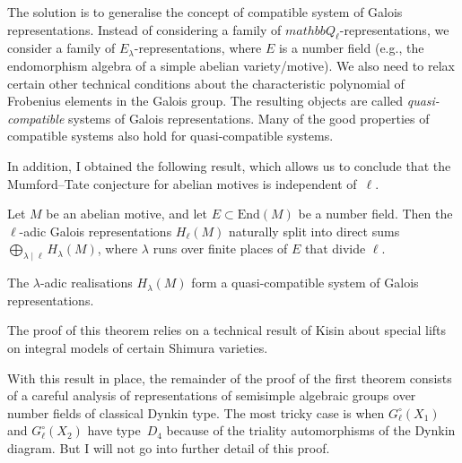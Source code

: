 The solution is to generalise the concept of compatible system of Galois representations.
Instead of considering a family of $mathbb Q_\ell$-representations,
we consider a family of $E_\lambda$-representations, where $E$ is a number field
(e.g., the endomorphism algebra of a simple abelian variety/motive).
We also need to relax certain other technical conditions
about the characteristic polynomial of Frobenius elements in the Galois group.
The resulting objects are called \emph{quasi-compatible} systems of Galois representations.
Many of the good properties of compatible systems also hold for quasi-compatible systems.

In addition, I obtained the following result,
which allows us to conclude
that the Mumford--Tate conjecture for abelian motives is independent of~$\ell$.

Let $M$ be an abelian motive, and let $E \subset \text{End}(M)$ be a number field.
Then the $\ell$-adic Galois representations $H_\ell(M)$
naturally split into direct sums $\bigoplus_{\lambda \mid \ell} H_\lambda(M)$,
where $\lambda$ runs over finite places of $E$ that divide $\ell$.

\begin{thm}[Commelin, 2019]
 The $\lambda$-adic realisations $H_\lambda(M)$
 form a quasi-compatible system of Galois representations.
\end{thm}

The proof of this theorem relies on a technical result of Kisin
about special lifts on integral models of certain Shimura varieties.

With this result in place,
the remainder of the proof of the first theorem
consists of a careful analysis of representations of semisimple algebraic groups over number fields of
classical Dynkin type.
The most tricky case is when $G_\ell^\circ(X_1)$ and $G_\ell^\circ(X_2)$ have type~$D_4$ because of the triality automorphisms of the Dynkin diagram.
But I will not go into further detail of this proof.
